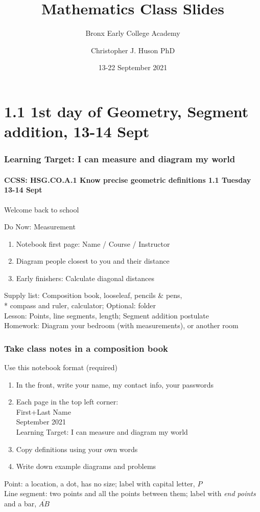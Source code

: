 \documentclass{beamer}
\title{Mathematics Class Slides}
\subtitle{Bronx Early College Academy}
\author{Christopher J. Huson PhD}
\date{13-22 September 2021}
\begin{document}
\frame{\titlepage}
\section[Outline]{}
\frame{\tableofcontents}

\section{1.1 1st day of Geometry, Segment addition, 13-14 Sept}
\frame
{
  \frametitle{Learning Target: I can measure and diagram my world}
  \framesubtitle{CCSS: HSG.CO.A.1 Know precise geometric definitions \hfill \alert{1.1 Tuesday 13-14 Sept}}

  Welcome back to school
  \begin{block}{Do Now: Measurement}
  \begin{enumerate}
      \item Notebook first page: Name / Course / Instructor
      \item Diagram people closest to you and their distance
      \item Early finishers: Calculate diagonal distances
  \end{enumerate}
  \end{block}
  Supply list: Composition book, looseleaf, pencils \& pens, \\*
  compass and ruler, calculator; Optional: folder \\[0.25cm]
  Lesson: Points, line segments, length; Segment addition postulate \\[0.25cm]
  Homework: Diagram your bedroom (with measurements), or another room
}

  \frame
  {
    \frametitle{Take class notes in a composition book}
    \begin{block}{Use this notebook format (required)}
      \begin{enumerate}
        \item In the front, write your name, my contact info, your passwords
        \item Each page in the top left corner: \\ \qquad First+Last Name \\
         September 2021 \\ \qquad Learning Target: I can measure and diagram my world \vspace{0.25cm}
        \item Copy definitions using your own words
        \item Write down example diagrams and problems
      \end{enumerate}
      \end{block}
    Point: a location, a dot, has no size; label with capital letter, $P$ \\[0.25cm]
    Line segment: two points and all the points between them; label with \emph{end points} and a bar, $\overline{AB}$ \\
  }
\end{document}
